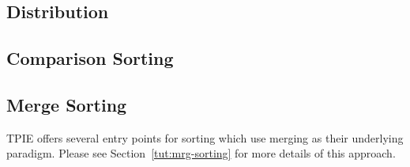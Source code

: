 


\subsection{Distribution}

\tobewritten


\subsection{Comparison Sorting}

\subsection{Merge Sorting} 

TPIE offers several entry points for sorting which use
merging as their underlying paradigm. Please see
Section~\ref{tut:mrg-sorting} for more details of this
approach.

